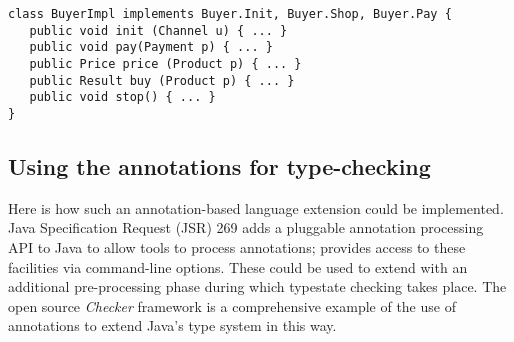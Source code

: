 \begin{lstlisting}
class BuyerImpl implements Buyer.Init, Buyer.Shop, Buyer.Pay {
   public void init (Channel u) { ... }
   public void pay(Payment p) { ... }
   public Price price (Product p) { ... }
   public Result buy (Product p) { ... }
   public void stop() { ... }
}
\end{lstlisting}

\subsection{Using the annotations for type-checking}

Here is how such an annotation-based language extension could be
implemented. Java Specification Request (JSR) 269 \cite{jsr269} adds a
pluggable annotation processing API to Java to allow tools to process
annotations;  provides access to these facilities via
command-line options. These could be used to extend  with
an additional pre-processing phase during which typestate checking takes
place. The open source \emph{Checker} framework \cite{papi08,dietl11}
is a comprehensive example of the use of annotations to extend Java's
type system in this way.
